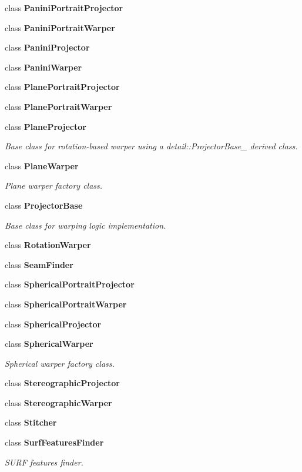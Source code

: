 \begin{DoxyCompactItemize}
class {\bfseries Panini\+Portrait\+Projector}
\item 
class {\bfseries Panini\+Portrait\+Warper}
\item 
class {\bfseries Panini\+Projector}
\item 
class {\bfseries Panini\+Warper}
\item 
class {\bfseries Plane\+Portrait\+Projector}
\item 
class {\bfseries Plane\+Portrait\+Warper}
\item 
class {\bfseries Plane\+Projector}
\begin{DoxyCompactList}\small\item\em Base class for rotation-\/based warper using a detail\+::\+Projector\+Base\+\_\+ derived class. \end{DoxyCompactList}\item 
class {\bfseries Plane\+Warper}
\begin{DoxyCompactList}\small\item\em Plane warper factory class. \end{DoxyCompactList}\item 
class {\bfseries Projector\+Base}
\begin{DoxyCompactList}\small\item\em Base class for warping logic implementation. \end{DoxyCompactList}\item 
class {\bfseries Rotation\+Warper}
\item 
class {\bfseries Seam\+Finder}
\item 
class {\bfseries Spherical\+Portrait\+Projector}
\item 
class {\bfseries Spherical\+Portrait\+Warper}
\item 
class {\bfseries Spherical\+Projector}
\item 
class {\bfseries Spherical\+Warper}
\begin{DoxyCompactList}\small\item\em Spherical warper factory class. \end{DoxyCompactList}\item 
class {\bfseries Stereographic\+Projector}
\item 
class {\bfseries Stereographic\+Warper}
\item 
class {\bfseries Stitcher}
\item 
class {\bfseries Surf\+Features\+Finder}
\begin{DoxyCompactList}\small\item\em S\+U\+RF features finder. \end{DoxyCompactList}\item 

\end{DoxyCompactItemize}
